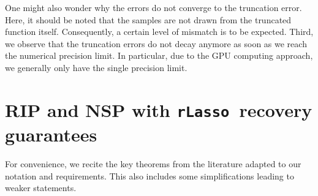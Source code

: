\documentclass[11pt,reqno, a4paper]{article}
\makeatletter
\numberwithin{equation}{section}
\renewcommand{\theHequation}{\thesection.\arabic{equation}}
\newcommand{\rlasso}{\texttt{rLasso}}
\let\oldappendix\appendix %
\renewcommand\appendix{%
    \oldappendix
    \newcommand{\section@cntformat}{\appendixname~\thesection\quad}
    \renewcommand{\theHsection}{appendix.\Alph{section}}
    \renewcommand{\theHsubsection}{appendix.\Alph{section}.\arabic{subsection}}
    \renewcommand{\theHsubsubsection}{appendix.\Alph{section}.\arabic{subsection}.\arabic{subsubsection}}
    \renewcommand{\theHequation}{appendix.\Alph{section}.\arabic{equation}}
    \renewcommand{\theHtheorem}{appendix.\Alph{section}.\arabic{theorem}}
    \renewcommand{\theHfigure}{appendix.\Alph{section}.\arabic{figure}}
    \renewcommand{\theHtable}{appendix.\Alph{section}.\arabic{table}}
}
\makeatother
\begin{document}
One might also wonder why the errors do not converge to the truncation error.
Here, it should be noted that the samples are not drawn from the truncated function itself.
Consequently, a certain level of mismatch is to be expected.
Third, we observe that the truncation errors do not decay anymore as soon as we reach the numerical precision limit.
In particular, due to the GPU computing approach, we generally only have the single precision limit.
\appendix

\section{RIP and NSP with \rlasso \ recovery guarantees}\label{app:RIPNSP}

For convenience, we recite the key theorems from the literature adapted to our notation and requirements.
This also includes some simplifications leading to weaker statements.
\end{document}
